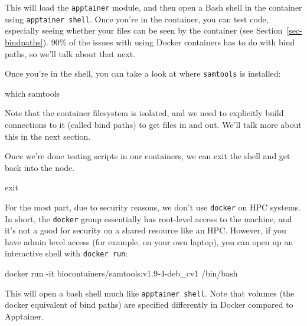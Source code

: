 \documentclass[
  letterpaper,
  DIV=11,
  numbers=noendperiod]{scrreprt}
\newenvironment{Shaded}{\begin{snugshade}}{\end{snugshade}}
\newcommand{\AttributeTok}[1]{\textcolor[rgb]{0.40,0.45,0.13}{#1}}
\newcommand{\BuiltInTok}[1]{\textcolor[rgb]{0.00,0.23,0.31}{#1}}
\newcommand{\ExtensionTok}[1]{\textcolor[rgb]{0.00,0.23,0.31}{#1}}
\newcommand{\FunctionTok}[1]{\textcolor[rgb]{0.28,0.35,0.67}{#1}}
\newcommand{\NormalTok}[1]{\textcolor[rgb]{0.00,0.23,0.31}{#1}}
\begin{document}
This will load the \texttt{apptainer} module, and then open a Bash shell
in the container using \texttt{apptainer\ shell}. Once you're in the
container, you can test code, especially seeing whether your files can
be seen by the container (see Section~\ref{sec-bindpaths}). 90\% of the
issues with using Docker containers has to do with bind paths, so we'll
talk about that next.

Once you're in the shell, you can take a look at where \texttt{samtools}
is installed:

\begin{Shaded}
\begin{Highlighting}[]
\FunctionTok{which}\NormalTok{ samtools}
\end{Highlighting}
\end{Shaded}

Note that the container filesystem is isolated, and we need to
explicitly build connections to it (called bind paths) to get files in
and out. We'll talk more about this in the next section.

Once we're done testing scripts in our containers, we can exit the shell
and get back into the node.

\begin{Shaded}
\begin{Highlighting}[]
\BuiltInTok{exit}
\end{Highlighting}
\end{Shaded}

\begin{tcolorbox}[enhanced jigsaw, colbacktitle=quarto-callout-note-color!10!white, left=2mm, toprule=.15mm, toptitle=1mm, opacityback=0, bottomrule=.15mm, breakable, leftrule=.75mm, colframe=quarto-callout-note-color-frame, bottomtitle=1mm, titlerule=0mm, coltitle=black, title=\textcolor{quarto-callout-note-color}{\faInfo}\hspace{0.5em}{Opening a Shell in a Docker Container with Docker}, rightrule=.15mm, arc=.35mm, opacitybacktitle=0.6, colback=white]

For the most part, due to security reasons, we don't use \texttt{docker}
on HPC systems. In short, the \texttt{docker} group essentially has
root-level access to the machine, and it's not a good for security on a
shared resource like an HPC. However, if you have admin level access
(for example, on your own laptop), you can open up an interactive shell
with \texttt{docker\ run}:

\begin{Shaded}
\begin{Highlighting}[]
\ExtensionTok{docker}\NormalTok{ run }\AttributeTok{{-}it}\NormalTok{ biocontainers/samtools:v1.9{-}4{-}deb\_cv1 /bin/bash}
\end{Highlighting}
\end{Shaded}

This will open a bash shell much like \texttt{apptainer\ shell}. Note
that volumes (the docker equivalent of bind paths) are specified
differently in Docker compared to Apptainer.

\end{tcolorbox}
\end{document}
